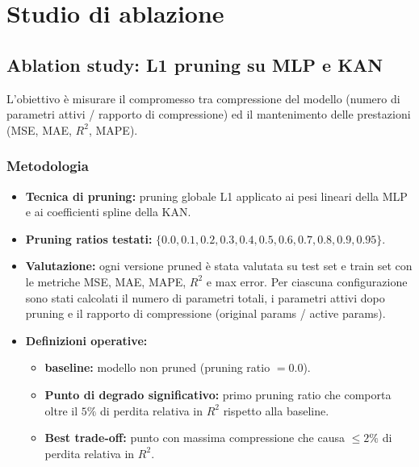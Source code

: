 \documentclass[a4paper,12pt]{report}
\begin{document}
	\section{Studio di ablazione}
	
	\subsection{Ablation study: L1 pruning su MLP e KAN}
	L'obiettivo è misurare il compromesso tra compressione del modello (numero di parametri attivi / rapporto di compressione) ed il mantenimento delle prestazioni (MSE, MAE, \(R^2\), MAPE).
	
	\subsubsection{Metodologia}
	\begin{itemize}
		\item \textbf{Tecnica di pruning:} pruning globale L1 applicato ai pesi lineari della MLP e ai coefficienti spline della KAN.
		\item \textbf{Pruning ratios testati:} \(\{0.0, 0.1, 0.2, 0.3, 0.4, 0.5, 0.6, 0.7, 0.8, 0.9, 0.95\}\).
		\item \textbf{Valutazione:} ogni versione pruned è stata valutata su test set e train set con le metriche MSE, MAE, MAPE, \(R^2\) e max error. Per ciascuna configurazione sono stati calcolati il numero di parametri totali, i parametri attivi dopo pruning e il rapporto di compressione (original params / active params).
		\item \textbf{Definizioni operative:} 
		\begin{itemize}
			\item \textbf{baseline:} modello non pruned (pruning ratio \(=0.0\)).
			\item \textbf{Punto di degrado significativo:} primo pruning ratio che comporta oltre il \(5\%\) di perdita relativa in \(R^2\) rispetto alla baseline.
			\item \textbf{Best trade-off:} punto con massima compressione che causa \(\le 2\%\) di perdita relativa in \(R^2\).
		\end{itemize}
	\end{itemize}
	
\end{document}
